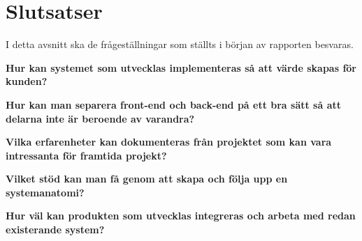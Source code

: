 \chapter{Slutsatser}
I detta avsnitt ska de frågeställningar som ställts i början av rapporten besvaras.

\textbf{Hur kan systemet som utvecklas implementeras så att värde skapas för kunden?}

\textbf{Hur kan man separera front-end och back-end på ett bra sätt så att delarna inte är beroende av varandra?}

\textbf{Vilka erfarenheter kan dokumenteras från projektet som kan vara intressanta för framtida projekt?}

\textbf{Vilket stöd kan man få genom att skapa och följa upp en systemanatomi?}

\textbf{Hur väl kan produkten som utvecklas integreras och arbeta med redan existerande system?}